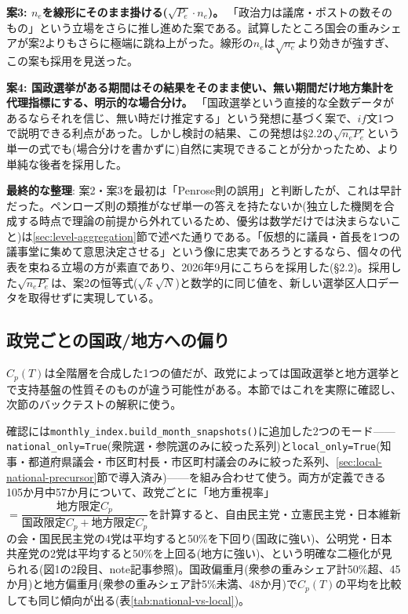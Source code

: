 \documentclass[a4paper,11pt]{ltjsarticle}
\begin{document}
\textbf{案3: $n_e$を線形にそのまま掛ける($\sqrt{P_e}\cdot n_e$)。} 「政治力は議席・ポストの数そのもの」という立場をさらに推し進めた案である。試算したところ国会の重みシェアが案2よりもさらに極端に跳ね上がった。線形の$n_e$は$\sqrt{n_e}$より効きが強すぎ、この案も採用を見送った。

\textbf{案4: 国政選挙がある期間はその結果をそのまま使い、無い期間だけ地方集計を代理指標にする、明示的な場合分け。} 「国政選挙という直接的な全数データがあるならそれを信じ、無い時だけ推定する」という発想に基づく案で、$if$文1つで説明できる利点があった。しかし検討の結果、この発想は\S2.2の$\sqrt{n_eP_e}$という単一の式でも(場合分けを書かずに)自然に実現できることが分かったため、より単純な後者を採用した。

\textbf{最終的な整理}: 案2・案3を最初は「Penrose則の誤用」と判断したが、これは早計だった。ペンローズ則の類推がなぜ単一の答えを持たないか(独立した機関を合成する時点で理論の前提から外れているため、優劣は数学だけでは決まらないこと)は\ref{sec:level-aggregation}節で述べた通りである。「仮想的に議員・首長を1つの議事堂に集めて意思決定させる」という像に忠実であろうとするなら、個々の代表を束ねる立場の方が素直であり、2026年9月にこちらを採用した(\S2.2)。採用した$\sqrt{n_eP_e}$は、案2の恒等式($\sqrt{k}\sqrt{N}$)と数学的に同じ値を、新しい選挙区人口データを取得せずに実現している。

\subsection{政党ごとの国政/地方への偏り}
\label{sec:national-local-focus}

$C_p(T)$は全階層を合成した1つの値だが、政党によっては国政選挙と地方選挙とで支持基盤の性質そのものが違う可能性がある。本節ではこれを実際に確認し、次節のバックテストの解釈に使う。

確認には\texttt{monthly\_index.build\_month\_snapshots()}に追加した2つのモード——\texttt{national\_only=True}(衆院選・参院選のみに絞った系列)と\texttt{local\_only=True}(知事・都道府県議会・市区町村長・市区町村議会のみに絞った系列、\ref{sec:local-national-precursor}節で導入済み)——を組み合わせて使う。両方が定義できる105か月中57か月について、政党ごとに「地方重視率」$=\dfrac{\text{地方限定}C_p}{\text{国政限定}C_p+\text{地方限定}C_p}$を計算すると、自由民主党・立憲民主党・日本維新の会・国民民主党の4党は平均すると50\%を下回り(国政に強い)、公明党・日本共産党の2党は平均すると50\%を上回る(地方に強い)、という明確な二極化が見られる(図1の2段目、note記事参照)。国政偏重月(衆参の重みシェア計50\%超、45か月)と地方偏重月(衆参の重みシェア計5\%未満、48か月)で$C_p(T)$の平均を比較しても同じ傾向が出る(表\ref{tab:national-vs-local})。
\end{document}

